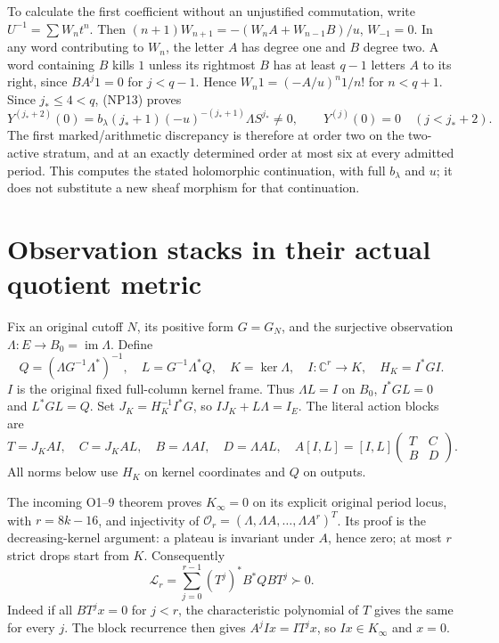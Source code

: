 \documentclass[11pt]{article}
\newcommand{\C}{\mathbb C}
\newcommand{\im}{\operatorname{im}}
\begin{document}
To calculate the first coefficient without an unjustified commutation,
write $U^{-1}=\sum W_nt^n$. Then
$(n+1)W_{n+1}=-(W_nA+W_{n-1}B)/u$, $W_{-1}=0$.
In any word contributing to $W_n$, the letter $A$ has degree one
and $B$ degree two. A word containing $B$ kills $1$ unless its
rightmost $B$ has at least $q-1$ letters $A$ to its right, since
$BA^j1=0$ for $j<q-1$. Hence
$W_n1=(-A/u)^n1/n!$ for $n<q+1$. Since $j_*\le4<q$,
(NP13) proves
\[
 Y^{(j_*+2)}(0)=b_\lambda(j_*+1)(-u)^{-(j_*+1)}
                    \Lambda S^{j_*}\ne0,\qquad
 Y^{(j)}(0)=0\quad(j<j_*+2). \tag{NP14}
\]
The first marked/arithmetic discrepancy is therefore at order two on
the two-active stratum, and at an exactly determined order at most six
at every admitted period. This computes the stated holomorphic
continuation, with full $b_\lambda$ and $u$; it does not substitute a
new sheaf morphism for that continuation.

\section{Observation stacks in their actual quotient metric}
Fix an original cutoff $N$, its positive form $G=G_N$, and the
surjective observation $\Lambda:E\to B_0=\im\Lambda$. Define
\[
 Q=(\Lambda G^{-1}\Lambda^*)^{-1},\quad
 L=G^{-1}\Lambda^*Q,\quad K=\ker\Lambda,\quad
 I:\C^r\longrightarrow K,\quad H_K=I^*GI. \tag{NP15}
\]
$I$ is the original fixed full-column kernel frame. Thus $\Lambda L=I$
on $B_0$, $I^*GL=0$ and $L^*GL=Q$. Set
$J_K=H_K^{-1}I^*G$, so $IJ_K+L\Lambda=I_E$.
The literal action blocks are
\[
 T=J_KAI,\quad C=J_KAL,\quad B=\Lambda AI,
 \quad D=\Lambda AL,\quad
 A[I,L]=[I,L]\begin{pmatrix}T&C\\B&D\end{pmatrix}.
 \tag{NP16}
\]
All norms below use $H_K$ on kernel coordinates and $Q$ on outputs.

The incoming O1--9 theorem \cite{native} proves $K_\infty=0$ on its
explicit original period locus, with $r=8k-16$, and injectivity of
$\mathcal O_r=(\Lambda,\Lambda A,\ldots,\Lambda A^r)^T$.
Its proof is the decreasing-kernel argument: a plateau is invariant
under $A$, hence zero; at most $r$ strict drops start from $K$.
Consequently
\[
 \mathcal L_r=\sum_{j=0}^{r-1}(T^j)^*B^*QB T^j\succ0.
 \tag{NP17}
\]
Indeed if all $BT^jx=0$ for $j<r$, the characteristic polynomial
of $T$ gives the same for every $j$. The block recurrence then gives
$A^jIx=IT^jx$, so $Ix\in K_\infty$ and $x=0$.
\end{document}
